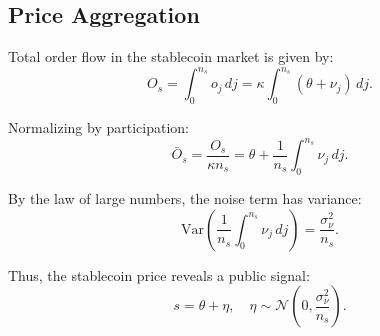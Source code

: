 \subsection{Price Aggregation}

Total order flow in the stablecoin market is given by:
\begin{equation}
O_s = \int_0^{n_s} o_j \, dj = \kappa \int_0^{n_s} (\theta + \nu_j) \, dj.
\end{equation}

Normalizing by participation:
\begin{equation}
\bar{O}_s = \frac{O_s}{\kappa n_s} = \theta + \frac{1}{n_s} \int_0^{n_s} \nu_j \, dj.
\end{equation}

By the law of large numbers, the noise term has variance:
\begin{equation}
\mathrm{Var}\left(\frac{1}{n_s} \int_0^{n_s} \nu_j \, dj\right) = \frac{\sigma_\nu^2}{n_s}.
\end{equation}

Thus, the stablecoin price reveals a public signal:
\begin{equation}
s = \theta + \eta, \quad \eta \sim \mathcal{N}\left(0, \frac{\sigma_\nu^2}{n_s}\right).
\end{equation}
